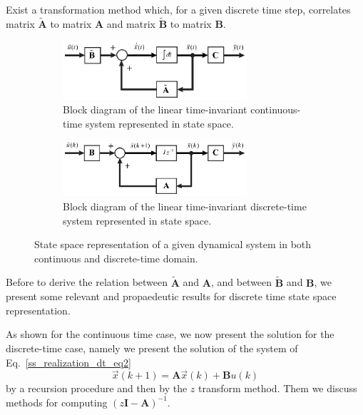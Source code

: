 \documentclass[11pt,a4paper,oneside]{book}
\numberwithin{equation}{section}
\theoremstyle{it}
\theoremstyle{definition}
\begin{document}
Exist a transformation method which, for a given discrete time step, correlates matrix $\tilde{\mathbf{A}}$ to matrix $\mathbf{A}$ and matrix $\tilde{\mathbf{B}}$ to matrix $\mathbf{B}$.
\begin{figure}[H]
	\centering
	\begin{subfigure}{.75\textwidth}
		\centering
		\includegraphics[width = 0.75\textwidth, width = 325pt, keepaspectratio]{figures/ct_state_space_rep_1.eps}
		\captionsetup{width=0.5\textwidth, font=small}		
		\caption{Block diagram of the linear time-invariant continuous-time system represented in state space.}
		\label{ct_ref}
	\end{subfigure}
	\begin{subfigure}{.75\textwidth}
		\centering
		\includegraphics[width = 0.75\textwidth, width = 325pt, keepaspectratio]{figures/dt_state_space_rep_1.eps}
		\captionsetup{width=0.5\textwidth, font=small}		
		\caption{Block diagram of the linear time-invariant discrete-time system represented in state space.}
		\label{dt_ref}
	\end{subfigure}
	\captionsetup{width=0.5\textwidth, font=small}		
	\caption{State space representation of a given dynamical system in both continuous and discrete-time domain.}
	\label{ss_rep}
\end{figure}

Before to derive the relation between $\tilde{\mathbf{A}}$ and $\mathbf{A}$, 
and between $\tilde{\mathbf{B}}$ and $\mathbf{B}$, we present some relevant and 
propaedeutic results for discrete time state space representation.

As shown for the continuous time case, we now present the solution for the 
discrete-time case, namely we present the solution of the system of 
Eq.~\eqref{ss_realization_dt_eq2}
\begin{equation}\label{ss_realization_dt_eq3}
	\vec{x}(k+1) = \mathbf{A}\vec{x}(k) + \mathbf{B}u(k)
\end{equation}
by a recursion procedure and then by the $z$ transform method. Them we discuss 
methods for computing $(z\mathbf{I}-\mathbf{A})^{-1}$.
\end{document}
